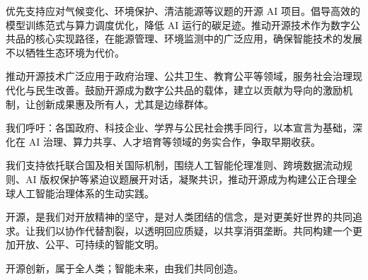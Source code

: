 优先支持应对气候变化、环境保护、清洁能源等议题的开源 AI 项目。倡导高效的模型训练范式与算力调度优化，降低 AI 运行的碳足迹。推动开源技术作为数字公共品的核心实现路径，在能源管理、环境监测中的广泛应用，确保智能技术的发展不以牺牲生态环境为代价。

推动开源技术广泛应用于政府治理、公共卫生、教育公平等领域，服务社会治理现代化与民生改善。鼓励开源成为数字公共品的载体，建立以贡献为导向的激励机制，让创新成果惠及所有人，尤其是边缘群体。

我们呼吁：各国政府、科技企业、学界与公民社会携手同行，以本宣言为基础，深化在 AI 治理、算力共享、人才培育等领域的务实合作，争取早期收获。

我们支持依托联合国及相关国际机制，围绕人工智能伦理准则、跨境数据流动规则、AI 版权保护等紧迫议题展开对话，凝聚共识，推动开源成为构建公正合理全球人工智能治理体系的生动实践。

开源，是我们对开放精神的坚守，是对人类团结的信念，是对更美好世界的共同追求。让我们以协作代替割裂，以透明回应质疑，以共享消弭垄断。共同构建一个更加开放、公平、可持续的智能文明。

开源创新，属于全人类；智能未来，由我们共同创造。
